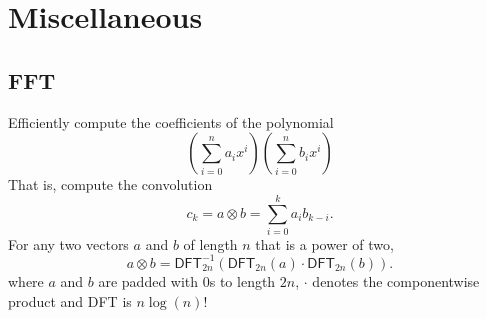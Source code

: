\section{Miscellaneous}
\subsection{FFT}
Efficiently compute the coefficients of the polynomial
\[ (\sum_{i=0}^n a_ix^i) (\sum_{i=0}^n b_ix^i) \]
That is, compute the convolution
\[ c_k = a \otimes b = \sum_{i=0}^k a_i b_{k-i}. \]
For any two vectors $a$ and $b$ of length $n$ that is a power of two,
\[ a \otimes b = \mathsf{DFT}^{-1}_{2n}(\mathsf{DFT}_{2n}(a) \cdot \mathsf{DFT}_{2n}(b)). \]
where $a$ and $b$ are padded with 0s to length $2n$, $\cdot$ denotes
the componentwise product and DFT is $n \log(n)$!



